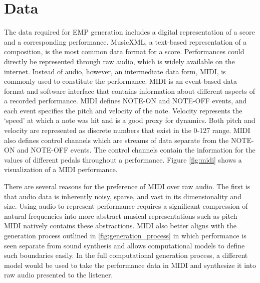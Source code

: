 \section{Data}
The data required for EMP generation includes a digital representation of a score and a corresponding performance. MusicXML, a text-based representation of a composition, is the most common data format for a score. Performances could directly be represented through raw audio, which is widely available on the internet. Instead of audio, however, an intermediate data form, MIDI, is commonly used to constitute the performance. MIDI is an event-based data format and software interface that contains information about different aspects of a recorded performance. MIDI defines NOTE-ON and NOTE-OFF events, and each event specifies the pitch and velocity of the note. Velocity represents the `speed' at which a note was hit and is a good proxy for dynamics. Both pitch and velocity are represented as discrete numbers that exist in the 0-127 range. MIDI also defines control channels which are streams of data separate from the NOTE-ON and NOTE-OFF events. The control channels contain the information for the values of different pedals throughout a performance. Figure \ref{fig:midi} shows a visualization of a MIDI performance. 

There are several reasons for the preference of MIDI over raw audio. The first is that audio data is inherently noisy, sparse, and vast in its dimensionality and size. Using audio to represent performance requires a significant compression of natural frequencies into more abstract musical representations such as pitch -- MIDI natively contains these abstractions. MIDI also better aligns with the generation process outlined in \ref{fig:generation_process} in which performance is seen separate from sound synthesis and allows computational models to define such boundaries easily. In the full computational generation process, a different model would be used to take the performance data in MIDI and synthesize it into raw audio presented to the listener. 


